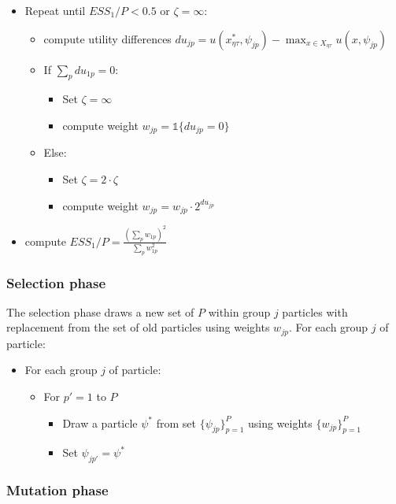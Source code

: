 \documentclass[12pt]{article}
\begin{document}
\begin{itemize}
\item Repeat until $ESS_1/P<0.5$ or $\zeta=\infty$:
	\begin{itemize}
		\item compute utility differences  $du_{jp} = u(x_{\eta \tau}^*,\psi_{jp}) - \max_{x \in X_{\eta \tau}} u(x,\psi_{jp})$
		\item If $\sum_p du_{1p} = 0$:
		\begin{itemize}
			\item Set $\zeta=\infty$
			\item compute weight $w_{jp} = \mathds{1}\{du_{jp}=0\}$
		\end{itemize}
		\item Else:
		\begin{itemize}
			\item Set $\zeta= 2 \cdot \zeta $
			\item compute weight $w_{jp} = w_{jp} \cdot 2^{ du_{jp}}$
		\end{itemize}
	\end{itemize}
	\item compute $ESS_1/P = \frac{(\sum_p w_{1p})^2}{\sum_p w_{1p}^2}$
\end{itemize}



\subsubsection{Selection phase}

The selection phase draws a new set of $P$ within group $j$ particles with replacement from the set of old particles using weights $w_{jp}$. For each group $j$ of particle:

\begin{itemize}
	\item For each group $j$ of particle:
	\begin{itemize}
		\item For $p'=1$ to $P$
		\begin{itemize}
			\item Draw a particle $\psi^*$ from set $\{\psi_{jp}\}_{p=1}^P$ using weights $\{w_{jp}\}_{p=1}^P$
			\item Set $\psi_{jp'} = \psi^*$
		\end{itemize}
	\end{itemize}
\end{itemize}

\subsubsection{Mutation phase}
\end{document}
